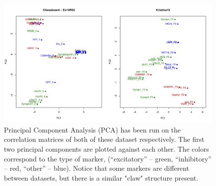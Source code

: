 \documentclass[simplex.tex]{subfiles}
\begin{document}
\begin{figure}[h!]
\begin{cframed}
\centering
\includegraphics[width=\textwidth]{./figs/2dProjClaw.pdf}
\caption{
  Principal Component Analysis (PCA) has been run on the correlation
  matrices of both of these dataset respectively.  The first two
  principal components are plotted against each other.  The colors
  correspond to the type of marker, (``excitatory'' -- green,
  ``inhibitory'' -- red, ``other'' -- blue).  Notice that some markers are
  different between datasets, but there is a similar "claw" structure
  present. 
}
\label{fig:synClaw}
\end{cframed}
\end{figure}
\end{document}
